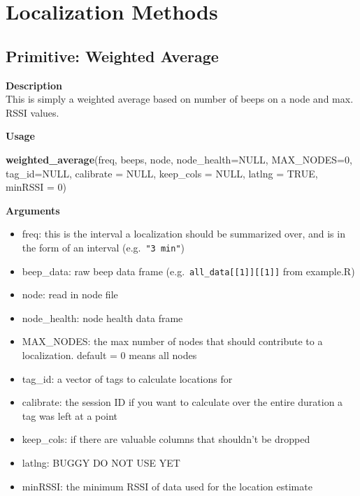 \documentclass[
]{book}
\newenvironment{Shaded}{\begin{snugshade}}{\end{snugshade}}
\newcommand{\AttributeTok}[1]{\textcolor[rgb]{0.13,0.29,0.53}{#1}}
\newcommand{\ConstantTok}[1]{\textcolor[rgb]{0.56,0.35,0.01}{#1}}
\newcommand{\DecValTok}[1]{\textcolor[rgb]{0.00,0.00,0.81}{#1}}
\newcommand{\FunctionTok}[1]{\textcolor[rgb]{0.13,0.29,0.53}{\textbf{#1}}}
\newcommand{\NormalTok}[1]{#1}
\providecommand{\tightlist}{%
  \setlength{\itemsep}{0pt}\setlength{\parskip}{0pt}}
\begin{document}
\chapter{Localization Methods}\label{localization-methods}

\section{Primitive: Weighted Average}\label{primitive-weighted-average}

\textbf{Description}\\
This is simply a weighted average based on number of beeps on a node and max. RSSI values.

\textbf{Usage}

\begin{Shaded}
\begin{Highlighting}[]
\FunctionTok{weighted\_average}\NormalTok{(freq, beeps, node, }\AttributeTok{node\_health=}\ConstantTok{NULL}\NormalTok{, }\AttributeTok{MAX\_NODES=}\DecValTok{0}\NormalTok{, }\AttributeTok{tag\_id=}\ConstantTok{NULL}\NormalTok{, }\AttributeTok{calibrate =} \ConstantTok{NULL}\NormalTok{, }\AttributeTok{keep\_cols =} \ConstantTok{NULL}\NormalTok{, }\AttributeTok{latlng =} \ConstantTok{TRUE}\NormalTok{, }\AttributeTok{minRSSI =} \DecValTok{0}\NormalTok{)}
\end{Highlighting}
\end{Shaded}

\textbf{Arguments}

\begin{itemize}
\tightlist
\item
  freq: this is the interval a localization should be summarized over, and is in the form of an interval (e.g.~\texttt{"3\ min"})\\
\item
  beep\_data: raw beep data frame (e.g.~\texttt{all\_data{[}{[}1{]}{]}{[}{[}1{]}{]}} from example.R)\\
\item
  node: read in node file\\
\item
  node\_health: node health data frame
\item
  MAX\_NODES: the max number of nodes that should contribute to a localization. default = 0 means all nodes
\item
  tag\_id: a vector of tags to calculate locations for
\item
  calibrate: the session ID if you want to calculate over the entire duration a tag was left at a point
\item
  keep\_cols: if there are valuable columns that shouldn't be dropped
\item
  latlng: BUGGY DO NOT USE YET
\item
  minRSSI: the minimum RSSI of data used for the location estimate
\end{itemize}
\end{document}
